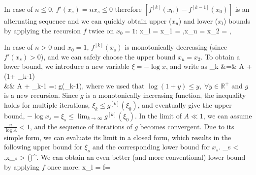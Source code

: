 In case of $n\leq 0$, $f'(x_s) = n x_s \leq 0$ therefore  $[f^{[k]}(x_0)
- f^{[k-1]}(x_0)]$ is an alternating sequence and we can quickly obtain
upper ($x_u$) and lower ($x_l$) bounds by applying the
recursion $f$ twice on $x_0 = 1$:
\bel
	x_l = x_1 =  ,\qquad x_u = x_2 =  ,
\eel

In case of $n>0$ and $x_0 = 1$,  $f^{[k]}(x_s)$
is monotonically decreasing (since $f'(x_s) > 0$), and we can safely
choose the upper bound $x_u = x_2$. To obtain a lower bound, we introduce a new
variable $\xi = - \log x$, and write  as
\bal
	\xi_{k} &=& \log\log A + \log\left(1+ \xi_{k-1}\right)
	\\
	&\leq&
	\log\log A + \xi_{k-1} =: g(\xi_{k-1}),
\eal
where we used that $\log (1+y) \leq y, \; \forall y\in \mathbb{R}^+$ and $g$ is
a new recursion.
Since $g$ is a monotonically increasing function, the  inequality holds for 
multiple iterations, $\xi_{k} \leq g^{[k]}(\xi_0)$, and eventually give the 
upper bound, $-\log x_s = \xi_s \leq \lim_{k\rightarrow \infty}g^{[k]}(\xi_0)$.
In the limit of $A\ll 1$, we can assume $\frac{n}{\log A} < 1$, and the
sequence of iterations of $g$ becomes convergent. Due to its simple form,
we can evaluate its limit in a closed form,  which results in the following
upper bound for $\xi_s$ and the corresponding lower bound for $x_s$.
\bel
	\xi_s < ,\qquad\rightarrow \qquad x_s >  \left(\right)^{}.
\eel
We can obtain an even better (and more conventional) lower bound by applying $f$
once more:
\bel
	x_l = f	= 
\eel

